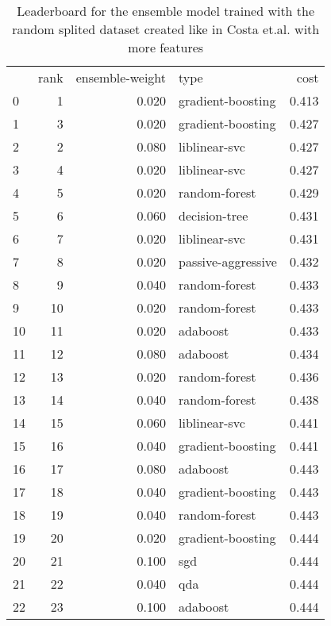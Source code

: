 \begin{table}[]
	\centering
	\begin{tabular}{lrrlr}
		   & rank & ensemble-weight & type               & cost  \\
		0  & 1    & 0.020           & gradient-boosting  & 0.413 \\
		1  & 3    & 0.020           & gradient-boosting  & 0.427 \\
		2  & 2    & 0.080           & liblinear-svc      & 0.427 \\
		3  & 4    & 0.020           & liblinear-svc      & 0.427 \\
		4  & 5    & 0.020           & random-forest      & 0.429 \\
		5  & 6    & 0.060           & decision-tree      & 0.431 \\
		6  & 7    & 0.020           & liblinear-svc      & 0.431 \\
		7  & 8    & 0.020           & passive-aggressive & 0.432 \\
		8  & 9    & 0.040           & random-forest      & 0.433 \\
		9  & 10   & 0.020           & random-forest      & 0.433 \\
		10 & 11   & 0.020           & adaboost           & 0.433 \\
		11 & 12   & 0.080           & adaboost           & 0.434 \\
		12 & 13   & 0.020           & random-forest      & 0.436 \\
		13 & 14   & 0.040           & random-forest      & 0.438 \\
		14 & 15   & 0.060           & liblinear-svc      & 0.441 \\
		15 & 16   & 0.040           & gradient-boosting  & 0.441 \\
		16 & 17   & 0.080           & adaboost           & 0.443 \\
		17 & 18   & 0.040           & gradient-boosting  & 0.443 \\
		18 & 19   & 0.040           & random-forest      & 0.443 \\
		19 & 20   & 0.020           & gradient-boosting  & 0.444 \\
		20 & 21   & 0.100           & sgd                & 0.444 \\
		21 & 22   & 0.040           & qda                & 0.444 \\
		22 & 23   & 0.100           & adaboost           & 0.444 \\
	\end{tabular}

	\caption{Leaderboard for the ensemble model trained with the random splited dataset created like in Costa et.al. with more features}
	\label{tab:lb-from-costaetal-self-randsplit}
\end{table}

